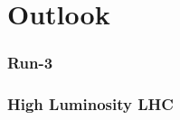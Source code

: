 \part {\LARGE{Outlook}}
\label{sec:Outlook}

\section{Run-3}
\label{sec:Run3}


\section{High Luminosity LHC}
\label{sec:HLLHC}

